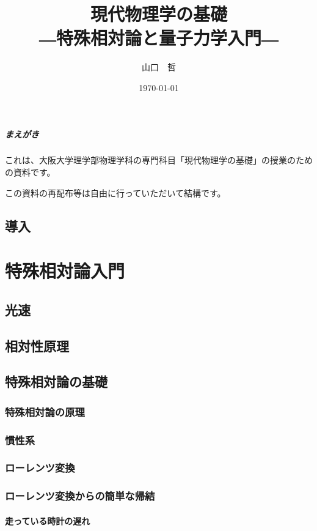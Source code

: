 \documentclass[report,paper=a4, fontsize=12pt, line_length=16cm, number_of_lines=33,dvipdfmx]{jlreq}
\title{現代物理学の基礎\\ ―特殊相対論と量子力学入門―}
\author{山口　哲}
\date{\today}
\numberwithin{equation}{chapter}
\begin{document}
\maketitle
\tableofcontents
\subsubsection*{まえがき}
これは、大阪大学理学部物理学科の専門科目「現代物理学の基礎」の授業のための資料です。

この資料の再配布等は自由に行っていただいて結構です。

\chapter{導入}

\part{特殊相対論入門}

\chapter{光速}

\chapter{相対性原理}

\chapter{特殊相対論の基礎}
\section{特殊相対論の原理}
\section{慣性系}
\section{ローレンツ変換}
\section{ローレンツ変換からの簡単な帰結}
\subsection{走っている時計の遅れ}
\end{document}
